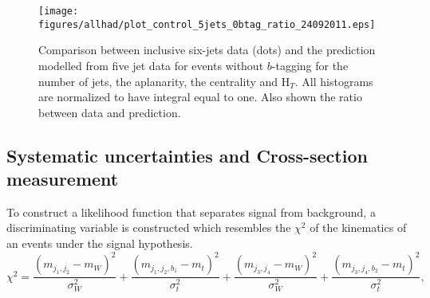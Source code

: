


\begin{figure}[h!]
  \begin{center}
    \texttt{[image: figures/allhad/plot\_control\_5jets\_0btag\_ratio\_24092011.eps]} 
  \end{center}
  \caption{Comparison between inclusive six-jets data (dots) and the prediction modelled from five jet data for events without $b$-tagging for the number of jets, the aplanarity, the centrality and H$_T$. All histograms are normalized to have integral equal to one. Also shown the ratio between data and prediction.}
  \label{fig:control_5jets_0btag.eps}
\end{figure} 



\subsection{Systematic uncertainties and Cross-section measurement}
\label{sec:xsec}

To construct a likelihood function that separates signal from background,
a discriminating variable is constructed which resembles the $\chi^2$ of the kinematics
of an events under the signal hypothesis.
\begin{equation}
\chi^2 =  \frac{ \left(m_{j_1, j_2} - m_{W}\right)^2}{\sigma_W^2} + \frac{ \left(m_{j_1, j_2, b_1} - m_{t}\right)^2}{\sigma_t^2} + \frac{ \left(m_{j_3, j_4} - m_{W}\right)^2}{\sigma_W^2} + \frac{ \left(m_{j_3, j_4, b_2} - m_{t}\right)^2}{\sigma_t^2}, 
\end{equation}

